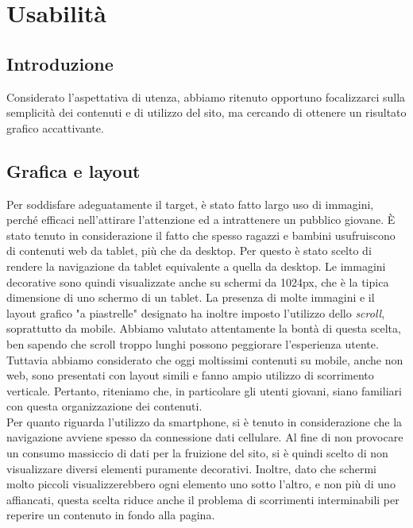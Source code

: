 \documentclass[12pt]{article}
\begin{document}
	
	\section{Usabilità}
	
	\subsection{Introduzione}
	
	Considerato l'aspettativa di utenza, abbiamo ritenuto opportuno focalizzarci sulla semplicità dei contenuti e di utilizzo del sito, ma cercando di ottenere un risultato grafico accattivante.
	
	\subsection{Grafica e layout}
	
	Per soddisfare adeguatamente il target, è stato fatto largo uso di immagini, perché efficaci nell'attirare l'attenzione ed a intrattenere un pubblico giovane. È stato tenuto in considerazione il fatto che spesso ragazzi e bambini usufruiscono di contenuti web da tablet, più che da desktop. Per questo è stato scelto di rendere la navigazione da tablet equivalente a quella da desktop. Le immagini decorative sono quindi visualizzate anche su schermi da 1024px, che è la tipica dimensione di uno schermo di un tablet.
	La presenza di molte immagini e il layout grafico "a piastrelle" designato ha inoltre imposto l'utilizzo dello \textit{scroll}, soprattutto da mobile. Abbiamo valutato attentamente la bontà di questa scelta, ben sapendo che scroll troppo lunghi possono peggiorare l'esperienza utente. Tuttavia abbiamo considerato che oggi moltissimi contenuti su mobile, anche non web, sono presentati con layout simili e fanno ampio utilizzo di scorrimento verticale. Pertanto, riteniamo che, in particolare gli utenti giovani, siano familiari con questa organizzazione dei contenuti. \\
	Per quanto riguarda l'utilizzo da smartphone, si è tenuto in considerazione che la navigazione avviene spesso da connessione dati cellulare. Al fine di non provocare un consumo massiccio di dati per la fruizione del sito, si è quindi scelto di non visualizzare diversi elementi puramente decorativi. Inoltre, dato che schermi molto piccoli visualizzerebbero ogni elemento uno sotto l'altro, e non più di uno affiancati, questa scelta riduce anche il problema di scorrimenti interminabili per reperire un contenuto in fondo alla pagina.\\
	
\end{document}
